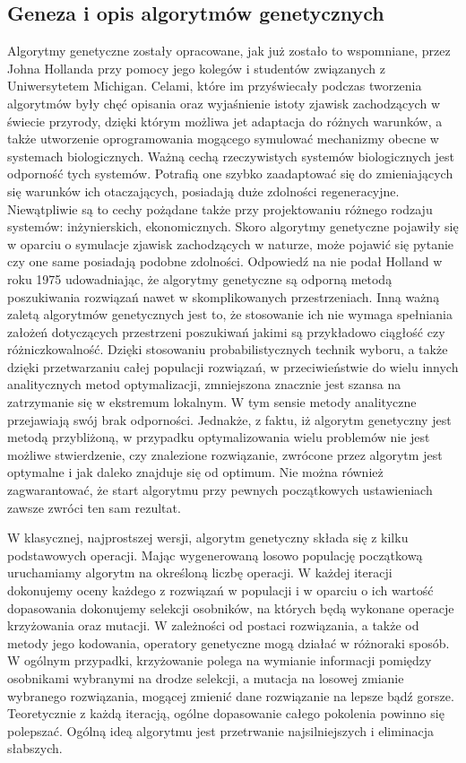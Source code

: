 \subsection{Geneza i opis algorytmów genetycznych}
Algorytmy genetyczne zostały opracowane, jak już zostało to wspomniane, przez Johna Hollanda przy pomocy jego kolegów i studentów związanych z Uniwersytetem Michigan. Celami, które im przyświecały podczas tworzenia algorytmów były chęć opisania oraz wyjaśnienie istoty zjawisk zachodzących w świecie przyrody, dzięki którym możliwa jet adaptacja do różnych warunków, a także utworzenie oprogramowania mogącego symulować mechanizmy obecne w systemach biologicznych. Ważną cechą rzeczywistych systemów biologicznych jest odporność tych systemów. Potrafią one szybko zaadaptować się do zmieniających się warunków ich otaczających, posiadają duże zdolności regeneracyjne. Niewątpliwie są to cechy pożądane także przy projektowaniu różnego rodzaju systemów: inżynierskich, ekonomicznych. Skoro algorytmy genetyczne pojawiły się w oparciu o symulacje zjawisk zachodzących w naturze, może pojawić się pytanie czy one same posiadają podobne zdolności. Odpowiedź na nie podał Holland w roku 1975 udowadniając, że algorytmy genetyczne są odporną metodą poszukiwania rozwiązań nawet w skomplikowanych przestrzeniach. Inną ważną zaletą algorytmów genetycznych jest to, że stosowanie ich nie wymaga spełniania założeń dotyczących przestrzeni poszukiwań jakimi są przykładowo ciągłość czy różniczkowalność. Dzięki stosowaniu probabilistycznych technik wyboru, a także dzięki przetwarzaniu całej populacji rozwiązań, w przeciwieństwie do wielu innych analitycznych metod optymalizacji, zmniejszona znacznie jest szansa na zatrzymanie się w ekstremum lokalnym. W tym sensie metody analityczne przejawiają swój brak odporności.
Jednakże, z faktu, iż algorytm genetyczny jest metodą przybliżoną, w przypadku optymalizowania wielu problemów nie jest możliwe stwierdzenie, czy znalezione rozwiązanie, zwrócone przez algorytm jest optymalne i jak daleko znajduje się od optimum. Nie można również zagwarantować, że start algorytmu przy pewnych początkowych ustawieniach zawsze zwróci ten sam rezultat.

W klasycznej, najprostszej wersji, algorytm genetyczny składa się z kilku podstawowych operacji. Mając wygenerowaną losowo populację początkową uruchamiamy algorytm na określoną liczbę operacji. W każdej iteracji dokonujemy oceny każdego z rozwiązań w populacji i w oparciu o ich wartość dopasowania dokonujemy selekcji osobników, na których będą wykonane operacje krzyżowania oraz mutacji. W zależności od postaci rozwiązania, a także od metody jego kodowania, operatory genetyczne mogą działać w różnoraki sposób. W ogólnym przypadki, krzyżowanie polega na wymianie informacji pomiędzy osobnikami wybranymi na drodze selekcji, a mutacja na losowej zmianie wybranego rozwiązania, mogącej zmienić dane rozwiązanie na lepsze bądź gorsze. Teoretycznie z każdą iteracją, ogólne dopasowanie całego pokolenia powinno się polepszać. Ogólną ideą algorytmu jest przetrwanie najsilniejszych i eliminacja słabszych.

